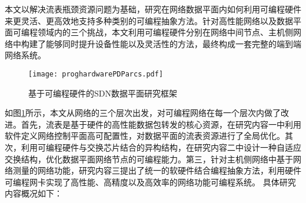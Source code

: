 \label{chap13}




本文以解决流表瓶颈资源问题为基础，研究在网络数据平面内如何利用可编程硬件来更灵活、更高效地支持多种类别的可编程抽象方法。针对高性能网络以及数据平面可编程领域内的三个挑战，本文利用可编程硬件分别在网络中间节点、主机侧网络中构建了能够同时提升设备性能以及灵活性的方法，最终构成一套完整的端到端网络系统。

\begin{figure}[!ht]
	\centering 
	\vspace{-1.5mm} 
	\texttt{[image: proghardwarePDParcs.pdf]}
	\caption{基于可编程硬件的SDN数据平面研究框架} \label{fig:proghardwarePDParcs}
\end{figure}

如图\ref{fig:proghardwarePDParcs}所示，本文从网络的三个层次出发，对可编程网络在每一个层次内做了改进。首先，流表是基于硬件的高性能数据包转发的核心资源，在研究内容一中利用软件定义网络控制平面高可配置性，对数据平面的流表资源进行了全局优化。其次，利用可编程硬件与交换芯片结合的异构结构，在研究内容二中设计一种自适应交换结构，优化数据平面网络节点的可编程能力。第三，针对主机侧网络中基于网络测量的网络功能，研究内容三提出了统一的软硬件结合编程抽象方法，利用硬件可编程网卡实现了高性能、高精度以及高效率的网络功能可编程系统。
%
%
%
具体研究内容概况如下：

